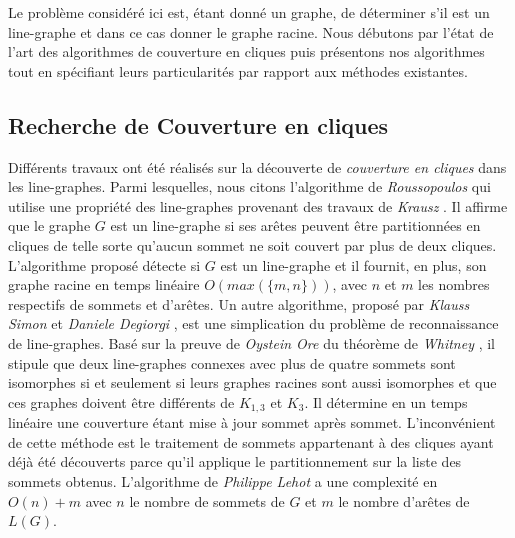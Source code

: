 

Le probl\`eme consid\'er\'e ici est, 
\'etant donn\'e un graphe, de d\'eterminer s'il est un line-graphe et dans ce cas donner le graphe racine.
Nous d\'ebutons par l'\'etat de l'art des algorithmes de couverture en cliques puis pr\'esentons nos algorithmes tout en sp\'ecifiant leurs particularit\'es par rapport aux m\'ethodes existantes. 

\subsection{Recherche de Couverture en cliques}
Diff\'erents travaux ont \'et\'e r\'ealis\'es sur la d\'ecouverte de {\em couverture en cliques} dans les line-graphes.
Parmi lesquelles, nous citons  l'algorithme de {\em Roussopoulos}  \cite{ROUSSOPOULOS1973108} qui utilise une propri\'et\'e des line-graphes provenant des travaux de {\em Krausz} \cite{krausz1943demonstration}. 
Il affirme que le graphe $G$ est un line-graphe si ses ar\^etes  peuvent \^etre partitionn\'ees en cliques  de telle sorte qu'aucun sommet ne soit couvert par plus de deux cliques. 
L'algorithme propos\'e d\'etecte si $G$ est un line-graphe et il fournit, en plus, son graphe racine en temps lin\'eaire $O(max(\{m,n\}))$, avec $n$ et $m$ les nombres respectifs de sommets et d'ar\^etes.
\newline
Un autre algorithme, propos\'e par {\em Klauss Simon} et {\em Daniele Degiorgi} \cite{decompositionEnCliques}, est une simplication du probl\`eme de reconnaissance de line-graphes. Bas\'e sur la preuve de {\em Oystein Ore} \cite{ORE} du th\'eor\`eme de {\em Whitney} \cite{whitney1932congruent}, il stipule que deux line-graphes connexes avec plus de quatre sommets sont isomorphes si et seulement si leurs graphes racines sont aussi isomorphes et que ces graphes  doivent \^etre diff\'erents de $K_{1,3}$ et $K_3$. Il d\'etermine en un temps lin\'eaire une couverture \'etant mise \`a jour sommet apr\`es sommet. 
L'inconv\'enient de cette m\'ethode est le traitement de sommets appartenant \`a des cliques ayant d\'ej\`a \'et\'e d\'ecouverts parce qu'il applique le partitionnement sur la liste des sommets obtenus.
\newline
L'algorithme de {\em Philippe Lehot} \cite{decompositionEnCliquesParArcs} a une complexit\'e en $O(n) + m$ avec $n$ le nombre de sommets de $G$ et $m$ le nombre d'ar\^etes de $L(G)$.
